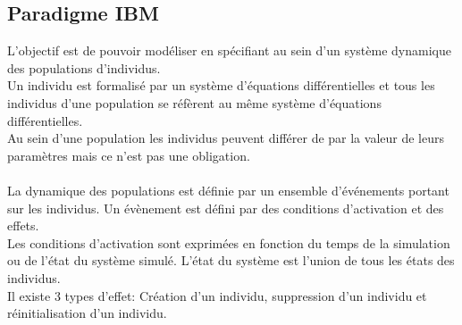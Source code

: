 \subsection{Paradigme IBM}
L'objectif est de pouvoir modéliser en spécifiant au sein d'un système dynamique des populations d'individus.\\
Un individu est formalisé par un système d'équations différentielles et tous les individus d'une population se réfèrent au même système d'équations différentielles.\\
Au sein d'une population les individus peuvent différer de par la valeur de leurs paramètres mais ce n'est pas une obligation.\\
\\
La dynamique des populations est définie par un ensemble d’événements portant sur les individus. Un évènement est défini par des conditions d'activation et des effets.\\
Les conditions d'activation sont exprimées en fonction du temps de la simulation ou de l'état du système simulé. L'état du système est l'union de tous les états des individus.\\
Il existe 3 types d'effet: Création d'un individu, suppression d'un individu et réinitialisation d'un individu.


